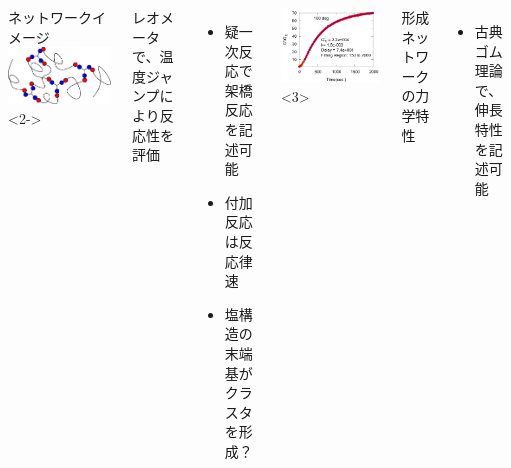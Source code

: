 \documentclass[unicode,12pt]{beamer}%
\begin{document}
\begin{frame}
\begin{columns}[T, totalwidth=\linewidth]
        {\scriptsize ネットワークイメージ}
        \includegraphics[width=\columnwidth]{Network_2.pdf}
    <2->
        {\scriptsize 
        レオメータで、温度ジャンプにより反応性を評価
        \begin{itemize}
        \item
        疑一次反応で架橋反応を記述可能
        \item
        付加反応は反応律速
        \item
        塩構造の末端基がクラスタを形成？
        \end{itemize}
        }
        \includegraphics[width=\columnwidth]{Cure_100deg.pdf}
    <3>
        {\scriptsize
        形成ネットワークの力学特性
        \begin{itemize}
        \item
        古典ゴム理論で、伸長特性を記述可能

\end{itemize}}
\end{columns}
\end{frame}
\end{document}
